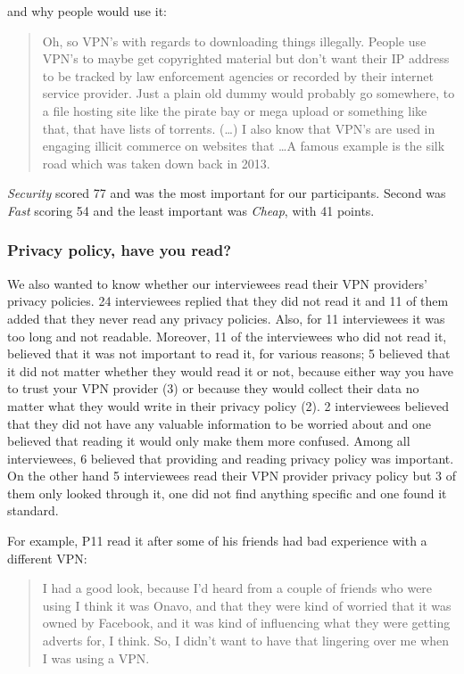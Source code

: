and why people would use it: \begin{quote}Oh, so VPN's with regards to
downloading things illegally. People use VPN's to maybe get copyrighted
material but don't want their IP address to be tracked by law enforcement
agencies or recorded by their internet service provider. Just a plain old
dummy would probably go somewhere, to a file hosting site like the pirate bay
or mega upload or something like that, that have lists of torrents. (\dots) I
also know that VPN's are used in engaging illicit commerce on websites that
\dots A famous example is the silk road which was taken down back in 2013.
\end{quote}



 \textit{Security} scored 77 and was the most important for
our participants. Second was \textit{Fast} scoring 54 and the least important
was \textit{Cheap}, with 41 points.


\subsubsection{Privacy policy, have you read?} We also wanted to know whether
our interviewees read their VPN providers’ privacy policies. 24 interviewees
replied that they did not read it and 11 of them added that they never read
any privacy policies. Also, for 11 interviewees it was too long and not
readable. Moreover, 11 of the interviewees who did not read it, believed that
it was not important to read it, for various reasons; 5 believed that it did
not matter whether they would read it or not, because either way you have to
trust your VPN provider (3) or because they would collect their data no matter
what they would write in their privacy policy (2). 2 interviewees believed
that they did not have any valuable information to be worried about and one
believed that reading it would only make them more confused. Among all
interviewees, 6 believed that providing and reading privacy policy was
important. On the other hand 5 interviewees read their VPN provider privacy
policy but 3 of them only looked through it, one did not find anything
specific and one found it standard. 

For example, P11 read it after some of his friends had bad experience with a
different VPN: \begin{quote}I had a good look, because I'd heard from a couple of friends
who were using I think it was Onavo, and that they were kind of worried
that it was owned by Facebook, and it was kind of influencing what they were
getting adverts for, I think.  So, I didn't want to have that lingering
over me when I was using a VPN.  \end{quote}


